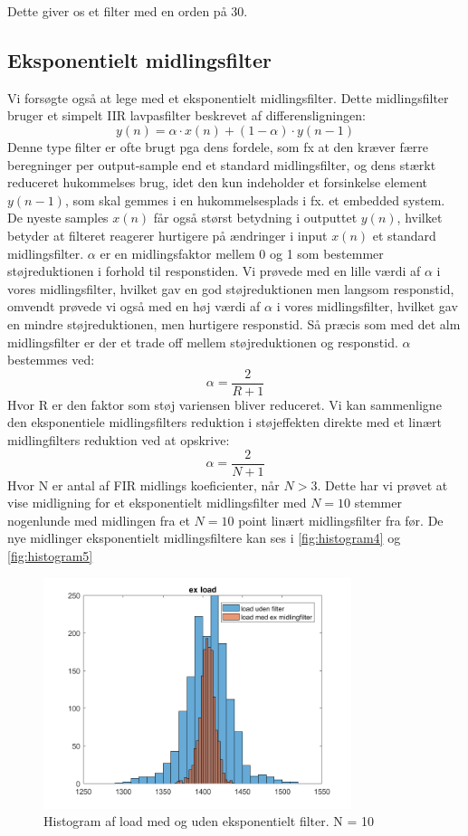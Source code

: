 \documentclass[12pt]{article}
\begin{document}
Dette giver os et filter med en orden på 30. 

\subsection{Eksponentielt midlingsfilter}
Vi forsøgte også at lege med et eksponentielt midlingsfilter. Dette midlingsfilter bruger et
simpelt IIR lavpasfilter beskrevet af differensligningen:
\[ y(n)= \alpha \cdot x(n)+(1-\alpha)\cdot y(n-1) \]
Denne type filter er ofte brugt pga dens fordele, som fx at den kræver færre beregninger per output-sample end et standard midlingsfilter, og dens stærkt reduceret hukommelses brug, idet den kun indeholder et forsinkelse element $y(n-1)$, som skal gemmes i en hukommelsesplads i fx. et embedded system. De nyeste samples $x(n)$ får også størst betydning i outputtet $y(n)$, hvilket betyder at filteret reagerer hurtigere på ændringer i input $x(n)$ et standard midlingsfilter. 
\newline
$\alpha$ er en midlingsfaktor mellem 0 og 1 som bestemmer støjreduktionen i forhold til responstiden. Vi prøvede med en lille værdi af $\alpha$ i vores midlingsfilter, hvilket gav en god støjreduktionen men langsom responstid, omvendt prøvede vi også med en høj værdi af $\alpha$ i vores midlingsfilter, hvilket gav en mindre støjreduktionen, men hurtigere responstid. Så præcis som med det alm midlingsfilter er der et trade off mellem støjreduktionen og responstid.
\newline
$\alpha$ bestemmes ved:
\[ \alpha = \dfrac{2}{R+1} \]
Hvor R er den faktor som støj variensen bliver reduceret. Vi kan sammenligne den eksponentiele midlingsfilters reduktion i støjeffekten direkte med et linært midlingfilters reduktion ved at opskrive:
\[ \alpha = \dfrac{2}{N+1}\]
Hvor N er antal af FIR midlings koeficienter, når $N>3$. Dette har vi prøvet at vise midligning for et eksponentielt midlingsfilter med $N=10$ stemmer nogenlunde med midlingen fra et $N=10$ point linært midlingsfilter fra før. De nye midlinger eksponentielt midlingsfiltere kan ses i \autoref{fig:histogram4} og \autoref{fig:histogram5}

\begin{figure}[H]
	\centering
	\includegraphics[width=90mm]{Img/Histogram_load_ex10.png}
	\caption{Histogram af load med og uden eksponentielt filter. N = 10}
	\label{fig:histogram4}
\end{figure}
\end{document}

